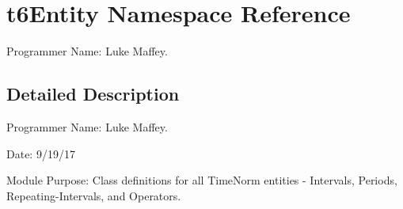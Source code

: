 \hypertarget{namespacet6Entity}{}\section{t6\+Entity Namespace Reference}
\label{namespacet6Entity}


Programmer Name\+: Luke Maffey.  




\subsection{Detailed Description}
Programmer Name\+: Luke Maffey. 

Date\+: 9/19/17

Module Purpose\+: Class definitions for all Time\+Norm entities -\/ Intervals, Periods, Repeating-\/\+Intervals, and Operators. 